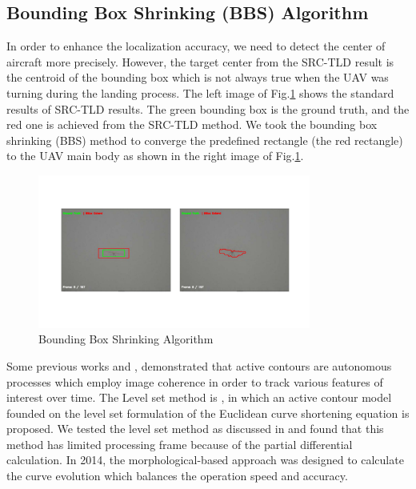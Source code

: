 \subsection{Bounding Box Shrinking (BBS) Algorithm}
In order to enhance the localization accuracy, we need to detect the center of aircraft more precisely. However, the target center from the SRC-TLD result is the centroid of the bounding box which is not always true when the UAV was turning during the landing process. The left image of Fig.\ref{fig:chp04_07_active_contour_demo} shows the standard results of SRC-TLD results. The green bounding box is the ground truth, and the red one is achieved from the SRC-TLD method. We took the bounding box shrinking (BBS) method to converge the predefined rectangle (the red rectangle) to the UAV main body as shown in the right image of Fig.\ref{fig:chp04_07_active_contour_demo}.

\begin{figure}[!th]
	\centering
	\includegraphics[width=0.8\textwidth]{Figs/chp04_07_active_contour_demo.pdf}
	\caption{Bounding Box Shrinking Algorithm}
	\label{fig:chp04_07_active_contour_demo}    
\end{figure}

Some previous works \cite{betser2004automatic} and \cite{sattigeri2007vision}, demonstrated that active contours are autonomous processes which employ image coherence in order to track various features of interest over time. The Level set method is \cite{368173}, \cite{Caselles1993} in which an active contour model founded on the level set formulation of the Euclidean curve shortening equation is proposed. We tested the level set method as discussed in \cite{kong2013autonomous} and found that this method has limited processing frame because of the partial differential calculation. In 2014, the morphological-based approach was designed to calculate the curve evolution \cite{Marquez-Neila2014} which balances the operation speed and accuracy. 

